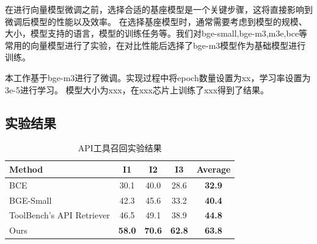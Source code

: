 在进行向量模型微调之前，选择合适的基座模型是一个关键步骤，这将直接影响到微调后模型的性能以及效率。
在选择基座模型时，通常需要考虑到模型的规模、大小，模型支持的语言，模型的训练任务等。我们对bge-small,bge-m3,m3e,bce等
常用的向量模型进行了实验，在对比性能后选择了bge-m3模型作为基础模型进行训练。


本工作基于bge-m3进行了微调。实现过程中将epoch数量设置为xx，学习率设置为3e-5进行学习。
模型大小为xxx，在xxx芯片上训练了xxx得到了结果。

\subsection{实验结果}

\begin{table}[!ht]
  \centering
  \caption{API工具召回实验结果}
  \label{tab:comparison}
  \begin{tabular}{lccc>{\bfseries}c} %
    \toprule
    \textbf{Method} & \textbf{I1} & \textbf{I2} & \textbf{I3} & \textbf{Average} \\ \midrule
    BCE         & 30.1 & 40.0 & 28.6 & 32.9 \\
    BGE-Small         & 42.3 & 45.6 & 33.2 & 40.4 \\
    ToolBench's API Retriever   & 46.5 & 49.1 & 38.9 & 44.8 \\
    Ours        & \textbf{58.0} & \textbf{70.6} & \textbf{62.8} & \textbf{63.8} \\ \bottomrule
  \end{tabular}
\end{table}





